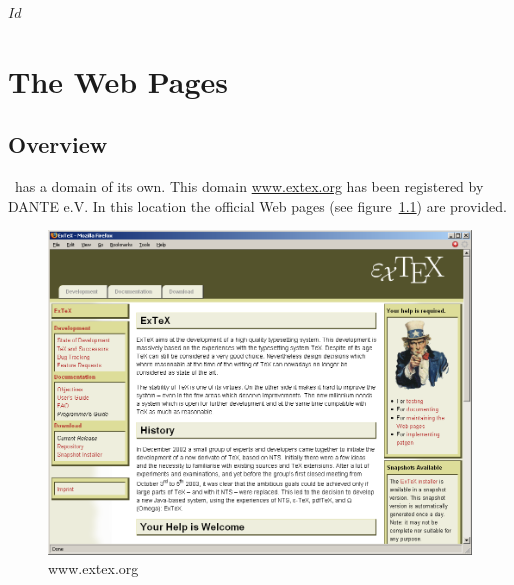 \SVN$Id$
\chapter{The Web Pages}

\section{Overview}

\ExTeX\ has a domain of its own. This domain \url{www.extex.org} has
been registered by DANTE e.V. In this location the official Web pages
(see figure~\ref{fig:www-extex-org}) are provided.
\begin{figure}[htb]
  \centering
  \includegraphics[scale=.4]{image/www-extex-org}
  \caption{www.extex.org}\label{fig:www-extex-org}
\end{figure}

